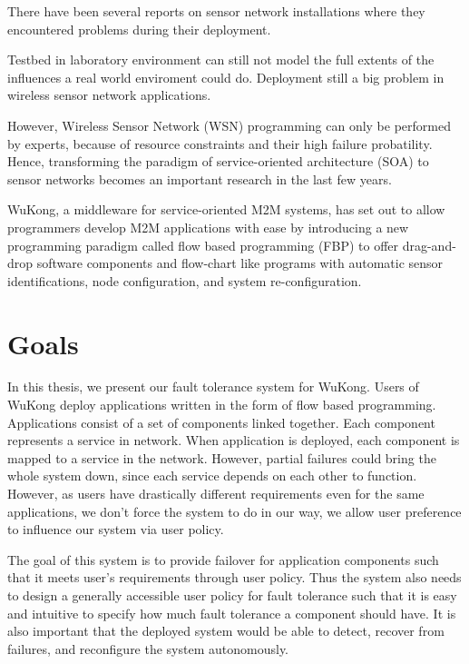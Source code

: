 There have been several reports on sensor network installations where they
encountered problems during their
deployment\cite{Barrenetxea2008,Polastre2004,Arora2004,Tateson2005,Padhy2005,Stoianov2007,Tolle2005,Werner-Allen2006a}.

Testbed in laboratory environment can still not model the full extents of the
influences a real world enviroment could do. Deployment still a big problem in
wireless sensor network applications.

However, Wireless Sensor Network (WSN) programming can only be performed by
experts, because of resource constraints and their high failure probatility.
Hence, transforming the paradigm of service-oriented architecture (SOA) to
sensor networks becomes an important research in the last few
years.~\cite{Koutsoukos2007,Hughes2012}

WuKong, a middleware for service-oriented M2M systems, has set out to allow
programmers develop M2M applications with ease by introducing a new
programming paradigm called flow based programming (FBP) to offer drag-and-drop
software components and flow-chart like programs with automatic sensor
identifications, node configuration, and system re-configuration.~\cite{Reijers}



\section{Goals} %

In this thesis, we present our fault tolerance system for WuKong.
Users of WuKong deploy applications written in the form of flow based
programming. Applications consist of a set of components linked together.  Each
component represents a service in network. When application is deployed, each
component is mapped to a service in the network. However, partial failures could
bring the whole system down, since each service depends on each other to
function. However, as users have drastically different requirements even for the
same applications, we don't force the system to do in our way, we allow user
preference to influence our system via user policy. 

The goal of this system is to provide failover for application components such
that it meets user's requirements through user policy. Thus the system also
needs to design a generally accessible user policy for fault tolerance such that
it is easy and intuitive to specify how much fault tolerance a component should
have. It is also important that the deployed system would be able to detect,
  recover from failures, and reconfigure the system autonomously. 



